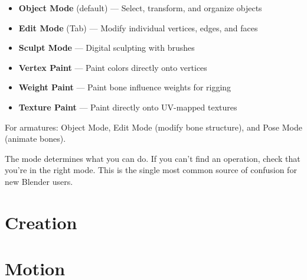 \documentclass[11pt,letterpaper,twoside,openright]{book}
\begin{document}
\begin{itemize}[leftmargin=2em]
  \item \textbf{Object Mode} (default) --- Select, transform, and organize objects
  \item \textbf{Edit Mode} (Tab) --- Modify individual vertices, edges, and faces
  \item \textbf{Sculpt Mode} --- Digital sculpting with brushes
  \item \textbf{Vertex Paint} --- Paint colors directly onto vertices
  \item \textbf{Weight Paint} --- Paint bone influence weights for rigging
  \item \textbf{Texture Paint} --- Paint directly onto UV-mapped textures
\end{itemize}

For armatures: Object Mode, Edit Mode (modify bone structure), and Pose Mode (animate bones).

The mode determines what you can do. If you can't find an operation, check that you're in the right mode. This is the single most common source of confusion for new Blender users.



\part{Creation}







\part{Motion}




\end{document}
